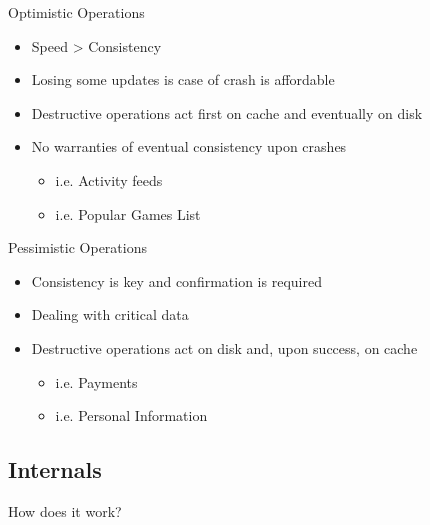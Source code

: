 \documentclass[aspectratio=169]{beamer}
\begin{document}
\begin{frame}{Optimistic Operations}
    \begin{itemize}
        \item Speed > Consistency
        \item Losing some updates is case of crash is affordable
        \item Destructive operations act first on cache and eventually on disk
        \item No warranties of eventual consistency upon crashes
            \begin{itemize}
                \item i.e. Activity feeds
                \item i.e. Popular Games List
            \end{itemize}
    \end{itemize}
\end{frame}

\begin{frame}{Pessimistic Operations}
    \begin{itemize}
        \item Consistency is key and confirmation is required
        \item Dealing with critical data
        \item Destructive operations act on disk and, upon success, on cache
            \begin{itemize}
                \item i.e. Payments
                \item i.e. Personal Information
            \end{itemize}
    \end{itemize}
\end{frame}

\subsection{Internals}
{
\begin{frame}{How does it work?}
\end{frame}
}
\end{document}
